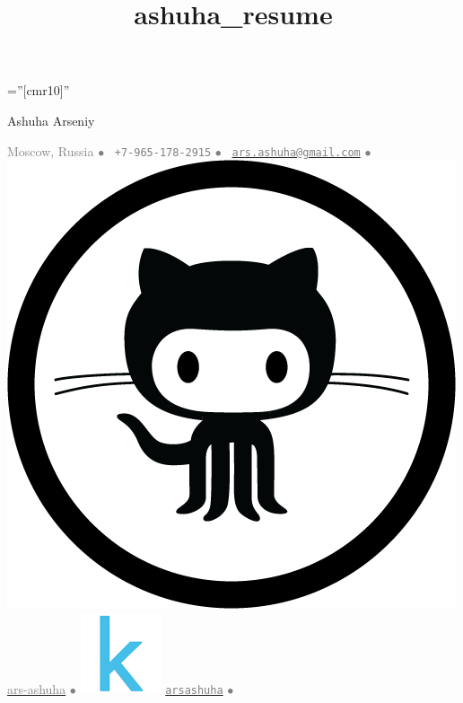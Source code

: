 \documentclass[a4paper,10pt]{article} %
\title{ashuha_resume}
\begin{document}
\pagestyle{empty} %

\font\fb=''[cmr10]'' %
\oddsidemargin=0pt 		%

\begin{center}
	{\huge Ashuha Arseniy}
\end{center}

{\centering \textcolor{gray}{
Moscow, Russia $\bullet$ 
\Mobilefone~\texttt{+7-965-178-2915} $\bullet$ 
\Letter~\href{mail:ars.ashuha@gmail.com}{\textcolor{gray}{\texttt{ars.ashuha@gmail.com}}} $\bullet$ \includegraphics[scale=0.015]{img/github} \href{https://github.com/ars-ashuha}{\textcolor{gray}{ars-ashuha}} $\bullet$ 
\includegraphics[scale=0.08]{img/kaggle} \href{https://www.kaggle.com/arsashuha}{\textcolor{gray}{\texttt{arsashuha}}} $\bullet$ 
}}
\end{document}
